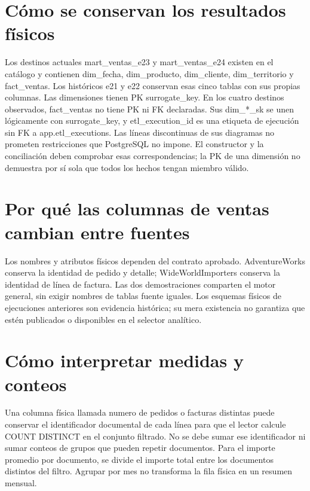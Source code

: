 \section{Cómo se conservan los resultados físicos}
Los destinos actuales mart\_\allowbreak{}ventas\_\allowbreak{}e23 y mart\_\allowbreak{}ventas\_\allowbreak{}e24 existen en el catálogo y contienen dim\_\allowbreak{}fecha, dim\_\allowbreak{}producto, dim\_\allowbreak{}cliente, dim\_\allowbreak{}territorio y fact\_\allowbreak{}ventas. Los históricos e21 y e22 conservan esas cinco tablas con sus propias columnas. Las dimensiones tienen PK surrogate\_\allowbreak{}key. En los cuatro destinos observados, fact\_\allowbreak{}ventas no tiene PK ni FK declaradas. Sus dim\_\allowbreak{}*\_\allowbreak{}sk se unen lógicamente con surrogate\_\allowbreak{}key, y etl\_\allowbreak{}execution\_\allowbreak{}id es una etiqueta de ejecución sin FK a app.etl\_\allowbreak{}executions. Las líneas discontinuas de sus diagramas no prometen restricciones que PostgreSQL no impone. El constructor y la conciliación deben comprobar esas correspondencias; la PK de una dimensión no demuestra por sí sola que todos los hechos tengan miembro válido.

\section{Por qué las columnas de ventas cambian entre fuentes}
Los nombres y atributos físicos dependen del contrato aprobado. AdventureWorks conserva la identidad de pedido y detalle; WideWorldImporters conserva la identidad de línea de factura. Las dos demostraciones comparten el motor general, sin exigir nombres de tablas fuente iguales. Los esquemas físicos de ejecuciones anteriores son evidencia histórica; su mera existencia no garantiza que estén publicados o disponibles en el selector analítico.

\section{Cómo interpretar medidas y conteos}
Una columna física llamada numero de pedidos o facturas distintas puede conservar el identificador documental de cada línea para que el lector calcule COUNT DISTINCT en el conjunto filtrado. No se debe sumar ese identificador ni sumar conteos de grupos que pueden repetir documentos. Para el importe promedio por documento, se divide el importe total entre los documentos distintos del filtro. Agrupar por mes no transforma la fila física en un resumen mensual.

